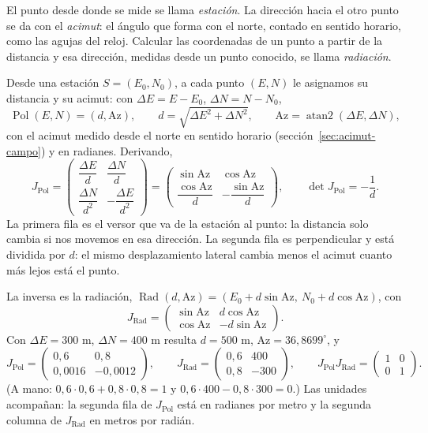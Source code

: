 \begin{idea}
El punto desde donde se mide se llama \emph{estación}. La dirección hacia el otro punto se da
con el \emph{acimut}: el ángulo que forma con el norte, contado en sentido horario, como las
agujas del reloj. Calcular las coordenadas de un punto a partir de la distancia y esa dirección,
medidas desde un punto conocido, se llama \emph{radiación}.
\end{idea}

\begin{ejemplo}\label{ej:der-dist-acimut}
Desde una estación \(S=(E_0,N_0)\), a cada punto \((E,N)\) le asignamos su distancia y su
acimut: con \(\Delta E=E-E_0\), \(\Delta N=N-N_0\),
\[
  \operatorname{Pol}(E,N)=(d,\mathrm{Az}),\qquad d=\sqrt{\Delta E^2+\Delta N^2},\qquad
  \mathrm{Az}=\operatorname{atan2}(\Delta E,\Delta N),
\]
con el acimut medido desde el norte en sentido horario (sección~\ref{sec:acimut-campo}) y en
radianes. Derivando,
\[
  J_{\operatorname{Pol}}=\begin{pmatrix}\dfrac{\Delta E}{d}&\dfrac{\Delta N}{d}\\[2mm]
  \dfrac{\Delta N}{d^2}&-\dfrac{\Delta E}{d^2}\end{pmatrix}
  =\begin{pmatrix}\sin\mathrm{Az}&\cos\mathrm{Az}\\[1mm]
  \dfrac{\cos\mathrm{Az}}{d}&-\dfrac{\sin\mathrm{Az}}{d}\end{pmatrix},
  \qquad \det J_{\operatorname{Pol}}=-\frac1d .
\]
La primera fila es el versor que va de la estación al punto: la distancia solo cambia si nos
movemos en esa dirección. La segunda fila es perpendicular y está dividida por \(d\): el mismo
desplazamiento lateral cambia menos el acimut cuanto más lejos está el punto.

La inversa es la radiación, \(\operatorname{Rad}(d,\mathrm{Az})=(E_0+d\sin\mathrm{Az},\ N_0+d\cos\mathrm{Az})\),
con
\[
  J_{\operatorname{Rad}}=\begin{pmatrix}\sin\mathrm{Az}&d\cos\mathrm{Az}\\ \cos\mathrm{Az}&-d\sin\mathrm{Az}\end{pmatrix}.
\]
Con \(\Delta E=300\) m, \(\Delta N=400\) m resulta \(d=500\) m, \(\mathrm{Az}=36{,}8699^\circ\), y
\[
  J_{\operatorname{Pol}}=\begin{pmatrix}0{,}6&0{,}8\\0{,}0016&-0{,}0012\end{pmatrix},\qquad
  J_{\operatorname{Rad}}=\begin{pmatrix}0{,}6&400\\0{,}8&-300\end{pmatrix},\qquad
  J_{\operatorname{Pol}}J_{\operatorname{Rad}}=\begin{pmatrix}1&0\\0&1\end{pmatrix}.
\]
(A mano: \(0{,}6\cdot0{,}6+0{,}8\cdot0{,}8=1\) y \(0{,}6\cdot400-0{,}8\cdot300=0\).) Las
unidades acompañan: la segunda fila de \(J_{\operatorname{Pol}}\) está en
radianes por metro y la segunda columna de \(J_{\operatorname{Rad}}\) en metros por radián.


\end{ejemplo}
